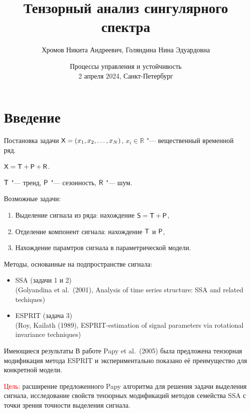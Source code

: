 \documentclass[ucs, notheorems, handout]{beamer}
\title[Tensor SSA]{Тензорный анализ сингулярного спектра}
\author[Хромов Н.А., Голяндина Н.Э.]{Хромов Никита Андреевич, Голяндина Нина Эдуардовна}
\institute[Санкт-Петербургский Государственный Университет]{%
    \small
    Санкт-Петербургский государственный университет\\
    Математико-механический факультет\\
    Кафедра статистического моделирования\\
    \vspace{1.25cm}
}
\date{Процессы управления и устойчивость\\
2 апреля 2024, Санкт-Петербург}
\newcommand{\bluetext}[1]{{\usebeamercolor[fg]{bluetext_color}#1}}
\begin{document}
    \begin{frame}[plain]
        \titlepage

    \end{frame}


    \section{Введение}\label{sec:introduction}
    \begin{frame}{Постановка задачи}
        $\mathsf{X}=(x_1, x_2,\ldots, x_N)$, $x_i\in \mathbb{R}$ "--- вещественный временной ряд.

        $\mathsf{X} = \mathsf{T} + \mathsf{P} + \mathsf{R}$.

        $\mathsf{T}$ "--- тренд, $\mathsf{P}$ "--- сезонность, $\mathsf{R}$ "--- шум.
        \vspace{0.3cm}

        \bluetext{Возможные задачи:}
        \begin{enumerate}
            \item Выделение сигнала из ряда: нахождение $\mathsf{S} = \mathsf{T} + \mathsf{P}$,
            \item Отделение компонент сигнала: нахождение $\mathsf{T}$ и $\mathsf{P}$,
            \item Нахождение парамтров сигнала в параметрической модели.
        \end{enumerate}

        \vspace{0.3cm}
        Методы, основанные на подпространстве сигнала:
        \begin{itemize}
            \item SSA (задачи 1 и 2)
            \\(Golyandina et al.\ (2001), Analysis of time series structure: SSA and related techiques)
            \item ESPRIT (задача 3)
            \\(Roy, Kailath (1989), ESPRIT-estimation of signal parameters via rotational invariance techniques)
        \end{itemize}
    \end{frame}

    \begin{frame}{Имеющиеся результаты}
        В работе Papy et al.\ (2005) была предложена тензорная модификация метода ESPRIT и экспериментально показано её
        преимущество для конкретной модели.

        \vspace{0.6cm}

        \textcolor{red}{Цель:} расширение предложенного Papy алгоритма для решения задачи выделения сигнала,
        исследование свойств тензорных модификаций методов семейства SSA с точки зрения
        точности выделения сигнала.
    \end{frame}
\end{document}
